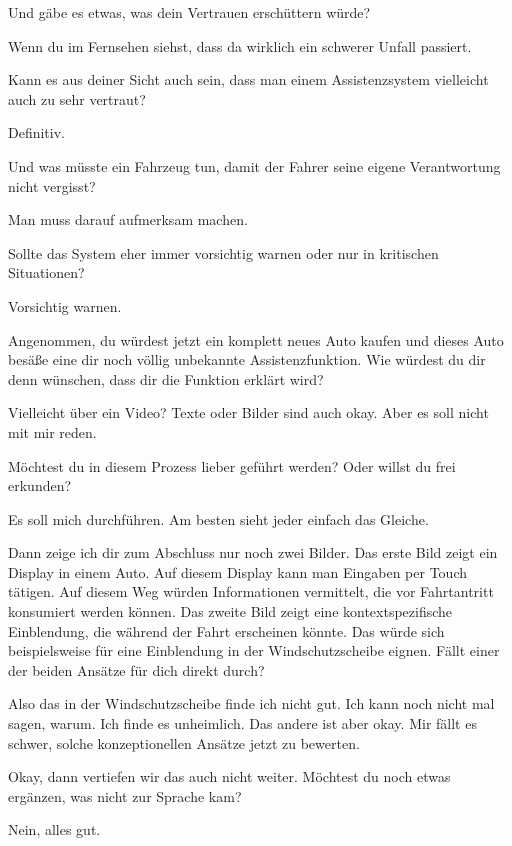 \interviewerin
Und gäbe es etwas, was dein Vertrauen erschüttern würde?

Wenn du im Fernsehen siehst, dass da wirklich ein schwerer Unfall
passiert.

\interviewerin
Kann es aus deiner Sicht auch sein, dass man einem Assistenzsystem
vielleicht auch zu sehr vertraut?

Definitiv.

\interviewerin
Und was müsste ein Fahrzeug tun, damit der Fahrer seine eigene
Verantwortung nicht vergisst?

Man muss darauf aufmerksam machen.

\interviewerin
Sollte das System eher immer vorsichtig warnen oder nur in kritischen
Situationen?

Vorsichtig warnen.

\interviewerin
Angenommen, du würdest jetzt ein komplett neues Auto kaufen und dieses
Auto besäße eine dir noch völlig unbekannte Assistenzfunktion. Wie
würdest du dir denn wünschen, dass dir die Funktion erklärt wird?

Vielleicht über ein Video? Texte oder Bilder sind auch okay. Aber es
soll nicht mit mir reden.

\interviewerin
Möchtest du in diesem Prozess lieber geführt werden? Oder willst du
frei erkunden?

Es soll mich durchführen. Am besten sieht jeder einfach das Gleiche.

\interviewerin
Dann zeige ich dir zum Abschluss nur noch zwei Bilder. Das erste Bild
zeigt ein Display in einem Auto. Auf diesem Display kann man Eingaben
per Touch tätigen. Auf diesem Weg würden Informationen vermittelt, die
vor Fahrtantritt konsumiert werden können. Das zweite Bild zeigt eine
kontextspezifische Einblendung, die während der Fahrt erscheinen
könnte. Das würde sich beispielsweise für eine Einblendung in der
Windschutzscheibe eignen. Fällt einer der beiden Ansätze für dich
direkt durch?

Also das in der Windschutzscheibe finde ich nicht gut. Ich kann noch
nicht mal sagen, warum. Ich finde es unheimlich. Das andere ist aber
okay. Mir fällt es schwer, solche konzeptionellen Ansätze jetzt zu
bewerten.

\interviewerin
Okay, dann vertiefen wir das auch nicht weiter. Möchtest du noch etwas
ergänzen, was nicht zur Sprache kam?

Nein, alles gut.


